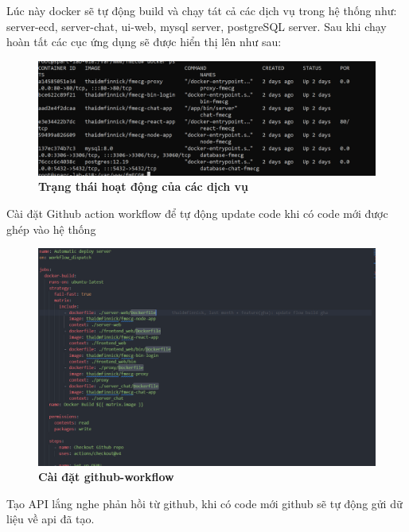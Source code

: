   Lúc này docker sẽ tự động build và chạy tát cả các dịch vụ trong hệ thống như: server-ecd, server-chat, ui-web, mysql server, postgreSQL server. Sau khi chạy hoàn tất các cục ứng dụng sẽ được hiển thị lên như sau:

  \begin{figure}[H]
    \centering
    \includegraphics[scale=0.5]{Images/server/deploy/docker-container.png}
    \caption[Trạng thái hoạt động của các dịch vụ]{\bfseries \fontsize{12pt}{0pt}
    \selectfont Trạng thái hoạt động của các dịch vụ}
    \label{docker-container-status} %
  \end{figure}

  Cài đặt Github action workflow để tự động update code khi có code mới được ghép vào hệ thống 
 
  \begin{figure}[H]
    \centering
    \includegraphics[scale=0.5]{Images/server/deploy/github-workflow.png}
    \caption[Cài đặt github-workflow]{\bfseries \fontsize{12pt}{0pt}
    \selectfont Cài đặt github-workflow}
    \label{github-workflow} %
  \end{figure}

  Tạo API lắng nghe phản hồi từ github, khi có code mới github sẽ tự động gửi dữ liệu về api đã tạo.

